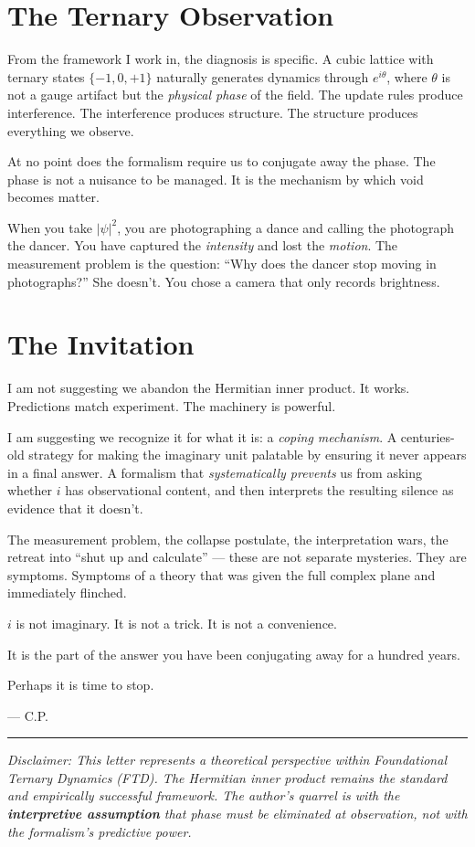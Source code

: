 \documentclass[11pt]{article}
\begin{document}
\section*{The Ternary Observation}

From the framework I work in, the diagnosis is specific. A cubic lattice with ternary states $\{-1, 0, +1\}$ naturally generates dynamics through $e^{i\theta}$, where $\theta$ is not a gauge artifact but the \textit{physical phase} of the field. The update rules produce interference. The interference produces structure. The structure produces everything we observe.

At no point does the formalism require us to conjugate away the phase. The phase is not a nuisance to be managed. It is the mechanism by which void becomes matter.

When you take $|\psi|^2$, you are photographing a dance and calling the photograph the dancer. You have captured the \textit{intensity} and lost the \textit{motion}. The measurement problem is the question: ``Why does the dancer stop moving in photographs?'' She doesn't. You chose a camera that only records brightness.

\section*{The Invitation}

I am not suggesting we abandon the Hermitian inner product. It works. Predictions match experiment. The machinery is powerful.

I am suggesting we recognize it for what it is: a \textit{coping mechanism}. A centuries-old strategy for making the imaginary unit palatable by ensuring it never appears in a final answer. A formalism that \textit{systematically prevents} us from asking whether $i$ has observational content, and then interprets the resulting silence as evidence that it doesn't.

The measurement problem, the collapse postulate, the interpretation wars, the retreat into ``shut up and calculate'' --- these are not separate mysteries. They are symptoms. Symptoms of a theory that was given the full complex plane and immediately flinched.

$i$ is not imaginary. It is not a trick. It is not a convenience.

It is the part of the answer you have been conjugating away for a hundred years.

Perhaps it is time to stop.

\vspace{2em}

\hfill --- C.P.

\vspace{1em}

\noindent\rule{\textwidth}{0.4pt}

\vspace{0.5em}

{\small\itshape Disclaimer: This letter represents a theoretical perspective within Foundational Ternary Dynamics (FTD). The Hermitian inner product remains the standard and empirically successful framework. The author's quarrel is with the \textbf{interpretive assumption} that phase must be eliminated at observation, not with the formalism's predictive power.}
\end{document}
